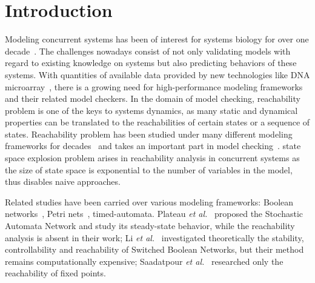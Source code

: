 \documentclass{article}
\theoremstyle{definition}
\begin{document}
\section{Introduction}
\label{intro}
Modeling concurrent systems has been of interest for systems biology for over one decade~\cite{bockmayr2002using,bortolussi2008modeling,wiley2003computational}. 
The challenges nowadays consist of not only validating models with regard to existing knowledge on systems but also predicting behaviors of these systems. 
With quantities of available data provided by new technologies like DNA microarray~\cite{marx2013}, there is a growing need for high-performance modeling frameworks and their related model checkers.
In the domain of model checking, reachability problem is one of the keys to systems dynamics, as many static and dynamical properties can be translated to the reachabilities of certain states or a sequence of states.
Reachability problem has been studied under many different modeling frameworks for decades~\cite{akutsu2007control,barrett2006complexity,Daws1998,esparza1998,mayr1984,wozna2003} and takes an important part in model checking~\cite{clarke2008birth,clarke20142}. 
state space explosion problem arises in reachability analysis in concurrent systems as the size of state space is exponential to the number of variables in the model, thus disables naive approaches. 

Related studies have been carried over various modeling frameworks: Boolean networks~\cite{akutsu2007control}, Petri nets~\cite{mayr1984,esparza1998}, timed-automata\cite{Daws1998,wozna2003}. 
Plateau \textit{et al.}~\cite{plateau1991stochastic} proposed the Stochastic Automata Network and study its steady-state behavior, while the reachability analysis is absent in their work; 
Li \textit{et al.}~\cite{li2012reachability,li2014stability} investigated theoretically the stability, controllability and reachability of Switched Boolean Networks, but their method remains computationally expensive;
Saadatpour \textit{et al.}~\cite{saadatpour2010attractor} researched only the reachability of fixed points.
\end{document}
